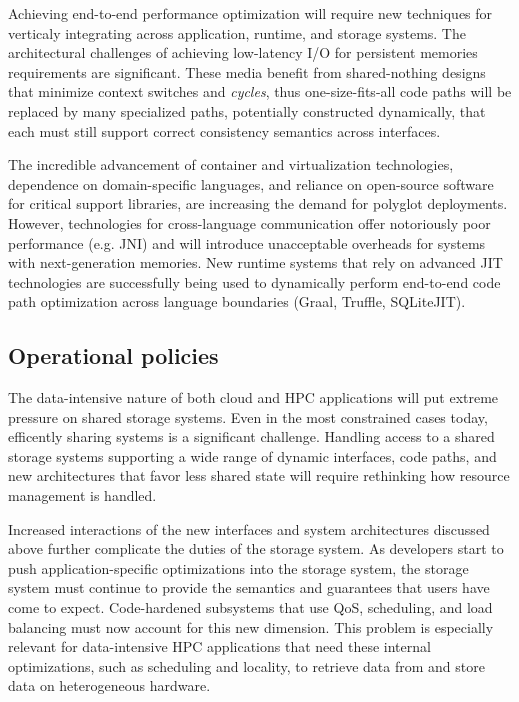 \documentclass{sig-alternate}
\begin{document}
Achieving end-to-end performance optimization will require new techniques for
verticaly integrating across application, runtime, and storage systems. The
architectural challenges of achieving low-latency I/O for persistent memories
requirements are significant. These media benefit from shared-nothing designs
that minimize context switches and \emph{cycles}, thus one-size-fits-all code
paths will be replaced by many specialized paths, potentially constructed
dynamically, that each must still support correct consistency semantics across
interfaces.

The incredible advancement of container and virtualization technologies,
dependence on domain-specific languages, and reliance on open-source software
for critical support libraries, are increasing the demand for polyglot
deployments. However, technologies for cross-language communication offer
notoriously poor performance (e.g. JNI) and will introduce unacceptable
overheads for systems with next-generation memories. New runtime systems that
rely on advanced JIT technologies are successfully being used to dynamically
perform end-to-end code path optimization across language boundaries (Graal,
Truffle, SQLiteJIT).

\subsection{Operational policies}

The data-intensive nature of both cloud and HPC applications will put extreme
pressure on shared storage systems. Even in the most constrained cases today,
efficently sharing systems is a significant challenge. Handling access to a
shared storage systems supporting a wide range of dynamic interfaces, code
paths, and new architectures that favor less shared state will require
rethinking how resource management is handled.

Increased interactions of the new interfaces and system architectures discussed
above further complicate the duties of the storage system. As developers start
to push application-specific optimizations into the storage system, the storage
system must continue to provide the semantics and guarantees that users have
come to expect. Code-hardened subsystems that use QoS, scheduling, and load
balancing must now account for this new dimension. This problem is especially
relevant for data-intensive HPC applications that need these internal
optimizations, such as scheduling and locality, to retrieve data from and store
data on heterogeneous hardware.
\end{document}
